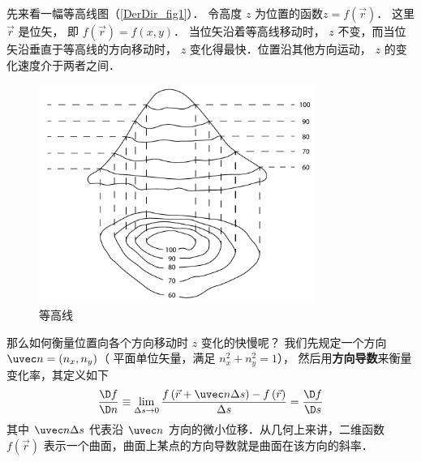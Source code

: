

先来看一幅等高线图（\autoref{DerDir_fig1}）． 令高度 $z$ 为位置的函数$z = f(\vec r)$． 这里 $\vec r$ 是位矢， 即 $f(\vec r) = f(x,y)$． 当位矢沿着等高线移动时， $z$ 不变，而当位矢沿垂直于等高线的方向移动时， $z$ 变化得最快．位置沿其他方向运动， $z$ 的变化速度介于两者之间．

\begin{figure}[h]
\centering
\includegraphics[width=9cm]{./figures/DerDir.pdf}
\caption{等高线}\label{DerDir_fig1}
\end{figure}

那么如何衡量位置向各个方向移动时 $z$ 变化的快慢呢？ 我们先规定一个方向 $\uvec n = (n_x,n_y)$（ 平面单位矢量，满足 $n_x^2 + n_y^2 = 1$）， 然后用\textbf{方向导数}来衡量变化率，其定义如下
 \begin{equation}
\frac{{\D f}}{{\D n}} \equiv \mathop {\lim }\limits_{\Delta s \to 0} \frac{{f\left( {\vec r + \uvec n\Delta s} \right) - f\left( {\vec r} \right)}}{{\Delta s}} = \frac{{\D f}}{{\D s}}
\end{equation}
其中 $\uvec n\Delta s$ 代表沿 $\uvec n$ 方向的微小位移．从几何上来讲，二维函数 $f(\vec r)$ 表示一个曲面，曲面上某点的方向导数就是曲面在该方向的斜率．


